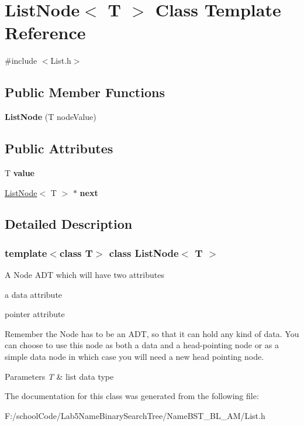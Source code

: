 \hypertarget{class_list_node}{}\section{List\+Node$<$ T $>$ Class Template Reference}
\label{class_list_node}


{\ttfamily \#include $<$List.\+h$>$}

\subsection*{Public Member Functions}
\begin{DoxyCompactItemize}
\item 
\mbox{\label{class_list_node_ab73e442b9e5e6fdd55fd14c7a286e703}} 
{\bfseries List\+Node} (T node\+Value)
\end{DoxyCompactItemize}
\subsection*{Public Attributes}
\begin{DoxyCompactItemize}
\item 
\mbox{\label{class_list_node_a897034a3810748838c5a64524ece0ea0}} 
T {\bfseries value}
\item 
\mbox{\label{class_list_node_a97909c9598053ffd24b77ec715f745f1}} 
\hyperlink{class_list_node}{List\+Node}$<$ T $>$ $\ast$ {\bfseries next}
\end{DoxyCompactItemize}


\subsection{Detailed Description}
\subsubsection*{template$<$class T$>$\newline
class List\+Node$<$ T $>$}

A Node A\+DT which will have two attributes
\begin{DoxyItemize}
\item a data attribute
\item pointer attribute
\end{DoxyItemize}Remember the Node has to be an A\+DT, so that it can hold any kind of data. You can choose to use this node as both a data and a head-\/pointing node or as a simple data node in which case you will need a new head pointing node. 
\begin{DoxyParams}{Parameters}
{\em T} & list data type \\
\hline
\end{DoxyParams}


The documentation for this class was generated from the following file\+:\begin{DoxyCompactItemize}
\item 
F\+:/school\+Code/\+Lab5\+Name\+Binary\+Search\+Tree/\+Name\+B\+S\+T\+\_\+\+B\+L\+\_\+\+A\+M/List.\+h\end{DoxyCompactItemize}
